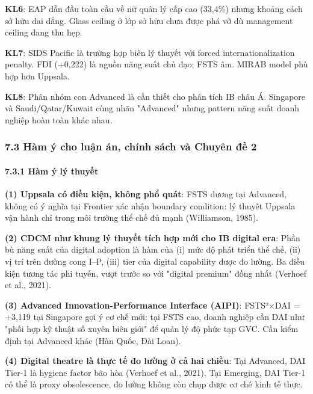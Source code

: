 \documentclass[12pt,a4paper]{article}
\begin{document}
\textbf{KL6}: EAP dẫn đầu toàn cầu về nữ quản lý cấp cao (33,4\%) nhưng
khoảng cách sở hữu dai dẳng. Glass ceiling ở lớp sở hữu chưa được phá vỡ
dù management ceiling đang thu hẹp.

\textbf{KL7}: SIDS Pacific là trường hợp biên lý thuyết với forced
internationalization penalty. FDI (+0,222) là nguồn năng suất chủ đạo;
FSTS âm. MIRAB model phù hợp hơn Uppsala.

\textbf{KL8}: Phân nhóm con Advanced là cần thiết cho phân tích IB châu
Á. Singapore và Saudi/Qatar/Kuwait cùng nhãn "Advanced" nhưng pattern
năng suất doanh nghiệp hoàn toàn khác nhau.

\hypertarget{73-huxe0m-uxfd-cho-luux1eadn-uxe1n-chuxednh-suxe1ch-vuxe0-chuyuxean-ux111ux1ec1-2}{%
\subsubsection{7.3 Hàm ý cho luận án, chính sách và Chuyên đề
2}\label{73-huxe0m-uxfd-cho-luux1eadn-uxe1n-chuxednh-suxe1ch-vuxe0-chuyuxean-ux111ux1ec1-2}}

\hypertarget{731-huxe0m-uxfd-luxfd-thuyux1ebft}{%
\paragraph{7.3.1 Hàm ý lý
thuyết}\label{731-huxe0m-uxfd-luxfd-thuyux1ebft}}

\textbf{(1) Uppsala có điều kiện, không phổ quát}: FSTS dương tại
Advanced, không có ý nghĩa tại Frontier xác nhận boundary condition: lý
thuyết Uppsala vận hành chỉ trong môi trường thể chế đủ mạnh
(Williamson, 1985).

\textbf{(2) CDCM như khung lý thuyết tích hợp mới cho IB digital era}:
Phần bù năng suất của digital adoption là hàm của (i) mức độ phát triển
thể chế, (ii) vị trí trên đường cong I--P, (iii) tier của digital
capability được đo lường. Ba điều kiện tương tác phi tuyến, vượt trước
so với "digital premium" đồng nhất (Verhoef et al., 2021).

\textbf{(3) Advanced Innovation-Performance Interface (AIPI)}: FSTS²×DAI
= +3,119 tại Singapore gợi ý cơ chế mới: tại FSTS cao, doanh nghiệp cần
DAI như "phối hợp kỹ thuật số xuyên biên giới" để quản lý độ phức tạp
GVC. Cần kiểm định tại Advanced khác (Hàn Quốc, Đài Loan).

\textbf{(4) Digital theatre là thực tế đo lường ở cả hai chiều}: Tại
Advanced, DAI Tier-1 là hygiene factor bão hòa (Verhoef et al., 2021).
Tại Emerging, DAI Tier-1 có thể là proxy obsolescence, đo lường không
còn chụp được cơ chế kinh tế thực.
\end{document}
